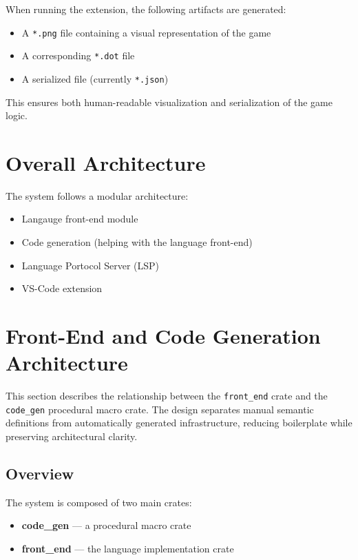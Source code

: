 \documentclass[a4paper,11pt]{article}
\begin{document}
When running the extension, the following artifacts are generated:
\begin{itemize}
    \item A \texttt{*.png} file containing a visual representation of the game
    \item A corresponding \texttt{*.dot} file
    \item A serialized file (currently \texttt{*.json})
\end{itemize}

This ensures both human-readable visualization and serialization of the game logic.

\section{Overall Architecture}

The system follows a modular architecture:

\begin{itemize}
    \item Langauge front-end module
    \item Code generation (helping with the language front-end)
    \item Language Portocol Server (LSP)
    \item VS-Code extension
\end{itemize}

\section{Front-End and Code Generation Architecture}

This section describes the relationship between the \texttt{front\_end}
crate and the \texttt{code\_gen} procedural macro crate. The design separates
manual semantic definitions from automatically generated infrastructure,
reducing boilerplate while preserving architectural clarity.

\subsection{Overview}

The system is composed of two main crates:

\begin{itemize}
    \item \textbf{code\_gen} — a procedural macro crate
    \item \textbf{front\_end} — the language implementation crate
\end{itemize}
\end{document}
